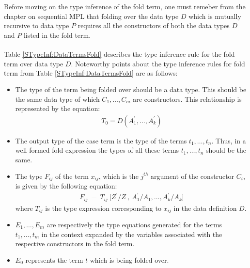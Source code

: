 \documentclass[11pt]{article}
\begin{document}
~~\\~~\\ 
Before moving on the type inference of the {\sf fold} term, one must remeber from the chapter on sequential MPL that folding over the data type $D$ which is mutually recursive to data type $P$ requires all the constructors of both the data types $D$ and $P$ listed in the {\sf fold} term. 
~~\\~~\\ 
Table \ref{STypeInf:DataTermsFold} describes the type inference rule for the {\sf fold} term over data type $D$. Noteworthy points about the type inference rules for {\sf fold} term from Table \ref {STypeInf:DataTermsFold} are as follows:
\begin{itemize}
  \item The type of the term being folded over should be a data type. This should be the same data type of which ${C_1,\ldots,C_m}$ are constructors. This relationship is represented by the equation:
  \begin{align*}
   T_0 = D(A_1^\prime,\ldots,A_k^\prime)
  \end{align*}
  \item The output type of the {\sf case} term is the type of the terms ${t_1,\ldots,t_n}$. Thus, in a well formed {\sf fold} expression the types of all these terms ${t_1,\ldots,t_n}$ should be the same.
  \item The type ${F_{ij}}$ of the term ${x_{ij}}$, which is the ${j^{th}}$ argument of the constructor ${C_i}$, is given by the following equation:
  \begin{align*}
  F_{ij}~=~T_{ij}~\Big[Z^\prime/Z~,~A_1^{\prime}/A_1,\ldots,A_k^{\prime}/A_k \Big]
  \end{align*}
  where ${T_{ij}}$ is the type expression corresponding to ${x_{ij}}$ in the data definition ${D}$.

  \item ${E_1,\ldots,E_m}$ are respectively the type equations generated for the terms ${t_1,\ldots,t_m}$ in the context expanded by the variables associated with the respective constructors in the {\sf fold} term. 
  \item ${E_0}$ represents the term ${t}$ which is being folded over.
\end{itemize}

\end{document}
